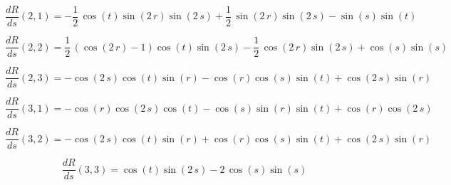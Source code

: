 \documentclass[a4paper,11pt]{article}
\begin{document}
\begin{equation}
\frac{dR}{ds}(2,1)=-\frac{1}{2} \, \cos\left(t\right) \sin\left(2 \, r\right) \sin\left(2 \, s\right) + \frac{1}{2} \, \sin\left(2 \, r\right) \sin\left(2 \, s\right) - \sin\left(s\right) \sin\left(t\right)
\end{equation}

\begin{equation}
\frac{dR}{ds}(2,2)=\frac{1}{2} \, {\left(\cos\left(2 \, r\right) - 1\right)} \cos\left(t\right) \sin\left(2 \, s\right) - \frac{1}{2} \, \cos\left(2 \, r\right) \sin\left(2 \, s\right) + \cos\left(s\right) \sin\left(s\right)
\end{equation}

\begin{equation}
\frac{dR}{ds}(2,3)=-\cos\left(2 \, s\right) \cos\left(t\right) \sin\left(r\right) - \cos\left(r\right) \cos\left(s\right) \sin\left(t\right) + \cos\left(2 \, s\right) \sin\left(r\right)
\end{equation}

\begin{equation}
\frac{dR}{ds}(3,1)=-\cos\left(r\right) \cos\left(2 \, s\right) \cos\left(t\right) - \cos\left(s\right) \sin\left(r\right) \sin\left(t\right) + \cos\left(r\right) \cos\left(2 \, s\right)
\end{equation}

\begin{equation}
\frac{dR}{ds}(3,2)=-\cos\left(2 \, s\right) \cos\left(t\right) \sin\left(r\right) + \cos\left(r\right) \cos\left(s\right) \sin\left(t\right) + \cos\left(2 \, s\right) \sin\left(r\right)
\end{equation}

\begin{equation}
\frac{dR}{ds}(3,3)=\cos\left(t\right) \sin\left(2 \, s\right) - 2 \, \cos\left(s\right) \sin\left(s\right)
\end{equation}
\end{document}

